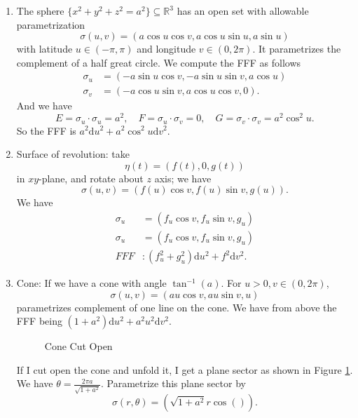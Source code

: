 \begin{example}
    \leavevmode
    \begin{enumerate}
        \item The sphere \(\{x^2 + y^2 + z^2 = a^2\}\subseteq \mathbb{R}^3\) has an open set with allowable parametrization
        \[
            \sigma(u,v) = (a\cos u\cos v,a\cos u\sin u,a\sin u)
        \]
        with latitude \(u \in (-\pi, \pi)\) and longitude \(v \in (0, 2\pi)\). It parametrizes the complement of a half great circle. We compute the FFF as follows
        \begin{align*}
            \sigma_u &= (-a\sin u\cos v, -a\sin u\sin v,a\cos u)\\
            \sigma_v &= (-a\cos u\sin v,a\cos u\cos v,0).
        \end{align*}
        And we have
        \[
            E = \sigma_{u} \cdot \sigma_u = a^2, \quad F=\sigma_u \cdot \sigma_v = 0, \quad G = \sigma_v \cdot \sigma_v = a^{2}\cos^{2}u.
        \]
        So the FFF is \(a^2 \mathrm{d}u^2 + a^2 \cos ^2 u \mathrm{d}v^2\).
        \item Surface of revolution: take
        \[
            \eta(t) = (f(t), 0, g(t))
        \]
        in \(xy\)-plane, and rotate about \(z\) axis; we have
        \[
            \sigma(u,v) = (f(u)\cos v, f(u) \sin v,g(u)).
        \]
        We have
        \begin{align*}
            \sigma_u &= (f_u \cos v, f_u \sin v, g_u)\\
            \sigma_u &= (f_u \cos v, f_u \sin v, g_u)\\
            FFF&:(f_u^2 + g_u^2)\mathrm{d}u^2 + f^2\mathrm{d}v^2.
        \end{align*}
        \item Cone: If we have a cone with angle \(\tan^{-1}(a)\). For \(u>0, v\in (0,2\pi)\),
        \[
            \sigma(u,v) = (au\cos v, au\sin v, u)
        \]
        parametrizes complement of one line on the cone. We have from above the FFF being \((1+a^2)\mathrm{d}u^2 + a^{2}u^2\mathrm{d}v^2\).
        
        \begin{figure}[H]
            \centering
            \caption{Cone Cut Open}
            \label{cutcone}
        \end{figure}
        If I cut open the cone and unfold it, I get a plane sector as shown in Figure \ref{cutcone}. We have \(\theta = \frac{2\pi a}{\sqrt{1 + a^2} }\). Parametrize this plane sector by
        \[
            \sigma(r, \theta) = (\sqrt{1 + a^2}r\cos ()).
        \]
    \end{enumerate}
\end{example}